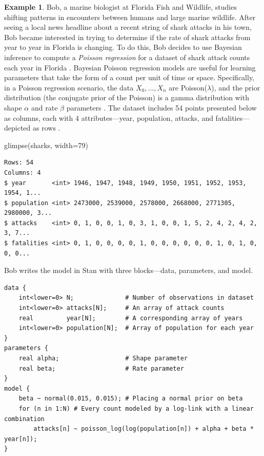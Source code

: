 \documentclass[
  12pt,
  twoside]{book}
\newenvironment{Shaded}{\begin{snugshade}}{\end{snugshade}}
\newcommand{\AttributeTok}[1]{\textcolor[rgb]{0.77,0.63,0.00}{#1}}
\newcommand{\DecValTok}[1]{\textcolor[rgb]{0.00,0.00,0.81}{#1}}
\newcommand{\FunctionTok}[1]{\textcolor[rgb]{0.00,0.00,0.00}{#1}}
\newcommand{\NormalTok}[1]{#1}
\theoremstyle{definition}
\theoremstyle{definition}
\newtheorem{example}{Example}[chapter]
\theoremstyle{definition}
\theoremstyle{remark}
\begin{document}
\begin{example}
\protect\hypertarget{exm:stan}{}{\label{exm:stan} }Bob, a marine biologist at Florida Fish and Wildlife, studies shifting patterns in encounters between humans and large marine wildlife.
After seeing a local news headline about a recent string of shark attacks in his town, Bob became interested in trying to determine if the rate of shark attacks from year to year in Florida is changing. To do this, Bob decides to use Bayesian inference to compute a \emph{Poisson regression} for a dataset of shark attack counts each year in Florida \citep{Collier2018}. Bayesian Poisson regression models are useful for learning parameters that take the form of a count per unit of time or space. Specifically, in a Poisson regression scenario, the data \(X_0,...,X_n\) are Poisson(\(\lambda\)), and the prior distribution (the conjugate prior of the Poisson) is a gamma distribution with shape \(\alpha\) and rate \(\beta\) parameters \citep{Hitchcock2014}. The dataset includes 54 points presented below as columns, each with 4 attributes---year, population, attacks, and fatalities---depicted as rows \citep{Simonoff2003}.
\end{example}

\begin{Shaded}
\begin{Highlighting}[]
\FunctionTok{glimpse}\NormalTok{(sharks, }\AttributeTok{width=}\DecValTok{79}\NormalTok{)}
\end{Highlighting}
\end{Shaded}

\begin{verbatim}
Rows: 54
Columns: 4
$ year       <int> 1946, 1947, 1948, 1949, 1950, 1951, 1952, 1953, 1954, 1...
$ population <int> 2473000, 2539000, 2578000, 2668000, 2771305, 2980000, 3...
$ attacks    <int> 0, 1, 0, 0, 1, 0, 3, 1, 0, 0, 1, 5, 2, 4, 2, 4, 2, 3, 7...
$ fatalities <int> 0, 1, 0, 0, 0, 0, 1, 0, 0, 0, 0, 0, 0, 1, 0, 1, 0, 0, 0...
\end{verbatim}

Bob writes the model in Stan with three blocks---data, parameters, and model.

\begin{verbatim}
data {
    int<lower=0> N;              # Number of observations in dataset
    int<lower=0> attacks[N];     # An array of attack counts
    real         year[N];        # A corresponding array of years
    int<lower=0> population[N];  # Array of population for each year
}
parameters {
    real alpha;                  # Shape parameter
    real beta;                   # Rate parameter
}                  
model {
    beta ~ normal(0.015, 0.015); # Placing a normal prior on beta
    for (n in 1:N) # Every count modeled by a log-link with a linear combination
        attacks[n] ~ poisson_log(log(population[n]) + alpha + beta * year[n]);
}
\end{verbatim}
\end{document}
